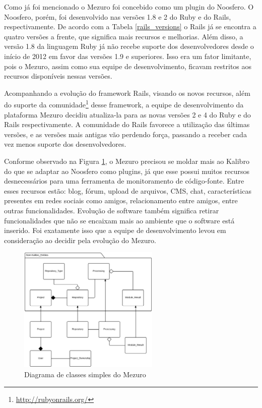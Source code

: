 
  
Como já foi mencionado o Mezuro foi concebido como um plugin do Noosfero. O Noosfero, porém, foi desenvolvido nas versões 1.8 e 2 do Ruby e do Rails, respectivamente. De acordo com a Tabela \ref{rails_versions} o Rails já se encontra a quatro versões a frente, que significa mais recursos e melhorias. Além disso, a versão 1.8 da linguagem Ruby já não recebe suporte dos desenvolvedores desde o início de 2012 em favor das versões 1.9 e superiores. Isso era um fator limitante, pois o Mezuro, assim como sua equipe de desenvolvimento, ficavam restritos aos recursos disponíveis nessas versões.

Acompanhando a evolução do framework Rails, visando os novos recursos, além do suporte da comunidade\footnote{\url{http://rubyonrails.org/}} desse framework, a equipe de desenvolvimento da plataforma Mezuro decidiu atualiza-la para as novas versões 2 e 4 do Ruby e do Rails respectivamente. A comunidade do Rails favorece a utilização das últimas versões, e as versões mais antigas vão perdendo força, passando a receber cada vez menos suporte dos desenvolvedores.

Conforme observado na Figura \ref{class-diagram}, o Mezuro precisou se moldar mais ao Kalibro do que se adaptar ao Noosfero como plugins, já que esse possui muitos recursos desnecessários para uma ferramenta de monitoramento de código-fonte. Entre esses recursos estão: blog, fórum, upload de arquivos, CMS, chat, características presentes em redes sociais como amigos, relacionamento entre amigos, entre outras funcionalidades. Evolução de software também significa retirar funcionalidades que não se encaixam mais ao ambiente que o software está inserido. Foi exatamente isso que a equipe de desenvolvimento levou em consideração ao decidir pela evolução do Mezuro.

\graphicspath{{figuras/}}
\begin{figure}[H]
\centering
\includegraphics[width=0.6\textwidth]{class-diagram-mezuro}
\caption{Diagrama de classes simples do Mezuro}
\label{class-diagram}
\end{figure}

